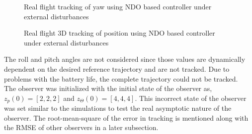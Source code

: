 \documentclass[letterpaper%
, twoside%
, 12pt%
,memoire%
, english%
,creativecommons,hyperref%
]{thETS}
\theoremstyle{newThmStyle}
\begin{document}
\begin{figure}[H]
	\centering
	\parbox{0.7\textwidth}{\caption{Real flight tracking of yaw using NDO based controller under external disturbances\label{Fig:yawtracNDODist}}}
\end{figure}
\begin{figure}[H]
	\centering
	\parbox{0.7\textwidth}{\caption{Real flight 3D tracking of position using NDO based controller under external disturbances\label{Fig:3dNDODist}}}
\end{figure}
The roll and pitch angles are not considered since those values are dynamically dependent on the desired reference trajectory and are not tracked. Due to problems with the battery life, the complete trajectory could not be tracked. \\
The observer was initialized with the initial state of the observer as, $z_p(0)=[2,2,2]$ and $z_\Theta(0)=[4,4,4]$. This incorrect state of the observer was set similar to the simulations to test the real asymptotic nature of the observer. The root-mean-square of the error in tracking is mentioned along with the RMSE of other observers in a later subsection.
\FloatBarrier
\end{document}
